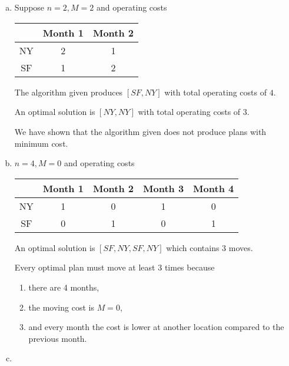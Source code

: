 \documentclass[12pt, a4paper]{article}
\begin{document}
\section{} %
\begin{enumerate}[(a)]
	\item %
	Suppose $n = 2, M = 2$ and operating costs\\
	\begin{tabular}{|c||c|c|}
		\hline
		& Month 1 & Month 2\\
		\hline
		NY & 2 & 1\\
		\hline
		SF & 1 & 2\\
		\hline
	\end{tabular}

	The algorithm given produces $[SF, NY]$ with total operating costs of $4$.

	An optimal solution is $[NY, NY]$ with total operating costs of $3$.

	We have shown that the algorithm given does not produce plans with minimum cost.

	\item %
	$n = 4, M = 0$ and operating costs\\
	\begin{tabular}{|c||c|c|c|c|}
		\hline
		& Month 1 & Month 2 & Month 3 & Month 4\\
		\hline
		NY & 1 & 0 & 1 & 0\\
		\hline
		SF & 0 & 1 & 0 & 1\\
		\hline
	\end{tabular}

	An optimal solution is $[SF, NY, SF, NY]$ which contains 3 moves.

	Every optimal plan must move at least 3 times because
	\begin{enumerate}
		\item there are 4 months,
		\item the moving cost is $M = 0$,
		\item and every month the cost is lower at another location compared to the previous month.
	\end{enumerate}

	\item %
\end{enumerate}
\end{document}
